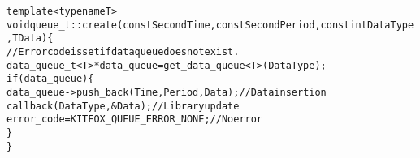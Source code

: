 {
\fontsize{10pt}{11pt}\selectfont
\begin{alltt}
template <typename T>
void queue_t::create(const Second Time, const Second Period, const int DataType, T Data) \{
    // Error code is set if data queue does not exist.
    data_queue_t<T> *data_queue = get_data_queue<T>(DataType);
    if(data_queue) \{
        data_queue->push_back(Time, Period, Data); // Data insertion
        callback(DataType, &Data); // Library update
        error_code = KITFOX_QUEUE_ERROR_NONE; // No error
    \}
\}
\end{alltt}
}

